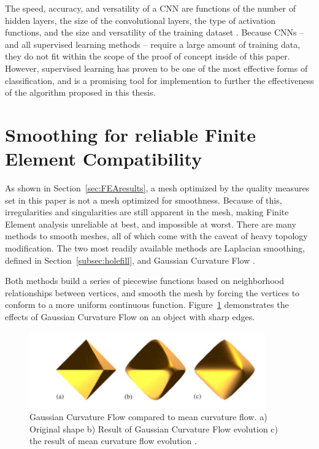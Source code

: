 \documentclass[12pt]{drexelthesis}
\let\Oldsection\section
\renewcommand{\section}{\FloatBarrier\Oldsection}
\begin{document}
The speed, accuracy, and versatility of a CNN are functions of the number of hidden layers, the size of the convolutional layers, the type of activation functions, and the size and versatility of the training dataset \cite{RN7}. Because CNNs -- and all supervised learning methods -- require a large amount of training data, they do not fit within the scope of the proof of concept inside of this paper. However, supervised learning has proven to be one of the most effective forms of classification, and is a promising tool for implemention to further the effectiveness of the algorithm proposed in this thesis.

\section{Smoothing for reliable Finite Element Compatibility}
As shown in Section~\ref{sec:FEAresults}, a mesh optimized by the quality measures set in this paper is not a mesh optimized for smoothness. Because of this, irregularities and singularities are still apparent in the mesh, making Finite Element analysis unreliable at best, and impossible at worst. There are many methods to smooth meshes, all of which come with the caveat of heavy topology modification. The two most readily available methods are Laplacian smoothing, defined in Section~\ref{subsec:holefill}, and Gaussian Curvature Flow \cite{RN44}.

Both methods build a series of piecewise functions based on neighborhood relationships between vertices, and smooth the mesh by forcing the vertices to conform to a more uniform continuous function. Figure~\ref{gausscurve} demonstrates the effects of Gaussian Curvature Flow on an object with sharp edges.

\begin{figure}
	\centering
	\includegraphics[width=4in]{gaussflow.png}
	\caption[Gaussian Curvature Flow example]{\centering Gaussian Curvature Flow compared to mean curvature flow. a) Original shape b) Result of Gaussian Curvature Flow evolution c) the result of mean curvature flow evolution \cite{RN44}.}
	\label{gausscurve}
\end{figure}
\end{document}
